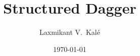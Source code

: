 \documentclass{beamer}
\title{Structured Dagger}
\institute[UIUC]{Parallel Programming Laboratory \\University of Illinois Urbana-Champaign}
\author{Laxmikant V.~Kal\'e}
\date{\today}
\begin{document}
\frame{\titlepage}


\end{document}
